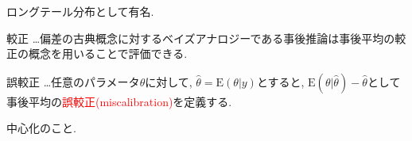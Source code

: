 \documentclass[11pt,a4pape,dvipdfmx]{jarticle}
\newcommand{\tcr}[1]{\textcolor{red}{#1}}
\begin{document}
ロングテール分布として有名.



\begin{itembox}[l]{較正}
…偏差の古典概念に対するベイズアナロジーである事後推論は事後平均の較正の概念を用いることで評価できる.
\end{itembox}


\begin{itembox}[l]{誤較正}
…任意のパラメータ$\theta$に対して, $\hat{\theta}=\text{E}(\theta|y)$とすると, $\text{E}(\theta|
\hat{\theta})-\hat{\theta}$として事後平均の\tcr{誤較正(miscalibration)}を定義する.
\end{itembox}

中心化のこと.





























\end{document}
